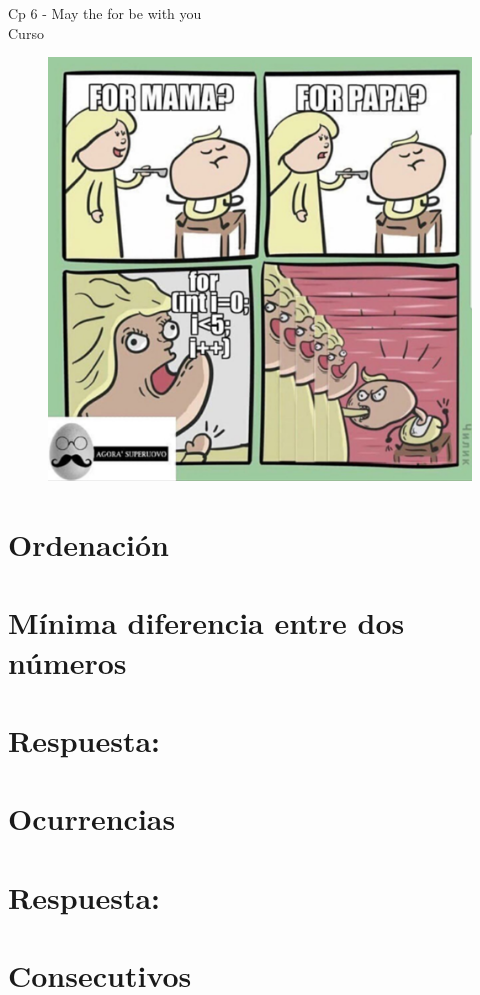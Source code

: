 \begin{center}
    \begin{large}
    Cp 6 - May the for be with you\\
    Curso \academicyear\\
    \end{large}
    \begin{figure}[h]
    	\centering
    	\includegraphics[width=0.4\linewidth]{cp6/loops_2.png}
    \end{figure}
\end{center}

\section{Ordenación}


\section{Mínima diferencia entre dos números}

\ifshowanswers
\section*{Respuesta:}

\fi

\section{Ocurrencias}

\ifshowanswers
\section*{Respuesta:}

\fi

\section{Consecutivos}

\ifshowanswers
